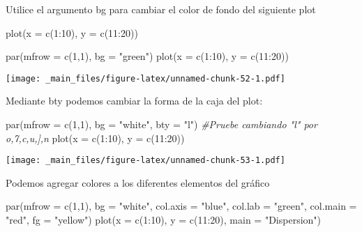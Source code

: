 \documentclass[
]{book}
\newenvironment{Shaded}{\begin{snugshade}}{\end{snugshade}}
\newcommand{\AttributeTok}[1]{\textcolor[rgb]{0.77,0.63,0.00}{#1}}
\newcommand{\CommentTok}[1]{\textcolor[rgb]{0.56,0.35,0.01}{\textit{#1}}}
\newcommand{\DecValTok}[1]{\textcolor[rgb]{0.00,0.00,0.81}{#1}}
\newcommand{\FunctionTok}[1]{\textcolor[rgb]{0.00,0.00,0.00}{#1}}
\newcommand{\NormalTok}[1]{#1}
\newcommand{\SpecialCharTok}[1]{\textcolor[rgb]{0.00,0.00,0.00}{#1}}
\newcommand{\StringTok}[1]{\textcolor[rgb]{0.31,0.60,0.02}{#1}}
\begin{document}
Utilice el argumento bg para cambiar el color de fondo del siguiente plot

\begin{Shaded}
\begin{Highlighting}[]
\FunctionTok{plot}\NormalTok{(}\AttributeTok{x =} \FunctionTok{c}\NormalTok{(}\DecValTok{1}\SpecialCharTok{:}\DecValTok{10}\NormalTok{), }\AttributeTok{y =} \FunctionTok{c}\NormalTok{(}\DecValTok{11}\SpecialCharTok{:}\DecValTok{20}\NormalTok{))}

\FunctionTok{par}\NormalTok{(}\AttributeTok{mfrow =} \FunctionTok{c}\NormalTok{(}\DecValTok{1}\NormalTok{,}\DecValTok{1}\NormalTok{), }\AttributeTok{bg =} \StringTok{"green"}\NormalTok{)}
\FunctionTok{plot}\NormalTok{(}\AttributeTok{x =} \FunctionTok{c}\NormalTok{(}\DecValTok{1}\SpecialCharTok{:}\DecValTok{10}\NormalTok{), }\AttributeTok{y =} \FunctionTok{c}\NormalTok{(}\DecValTok{11}\SpecialCharTok{:}\DecValTok{20}\NormalTok{))}
\end{Highlighting}
\end{Shaded}

\texttt{[image: \_main\_files/figure-latex/unnamed-chunk-52-1.pdf]}

Mediante bty podemos cambiar la forma de la caja del plot:

\begin{Shaded}
\begin{Highlighting}[]
\FunctionTok{par}\NormalTok{(}\AttributeTok{mfrow =} \FunctionTok{c}\NormalTok{(}\DecValTok{1}\NormalTok{,}\DecValTok{1}\NormalTok{), }\AttributeTok{bg =} \StringTok{"white"}\NormalTok{, }\AttributeTok{bty =} \StringTok{"l"}\NormalTok{) }\CommentTok{\#Pruebe cambiando "l" por o,7,c,u,],n}
\FunctionTok{plot}\NormalTok{(}\AttributeTok{x =} \FunctionTok{c}\NormalTok{(}\DecValTok{1}\SpecialCharTok{:}\DecValTok{10}\NormalTok{), }\AttributeTok{y =} \FunctionTok{c}\NormalTok{(}\DecValTok{11}\SpecialCharTok{:}\DecValTok{20}\NormalTok{))}
\end{Highlighting}
\end{Shaded}

\texttt{[image: \_main\_files/figure-latex/unnamed-chunk-53-1.pdf]}

Podemos agregar colores a los diferentes elementos del gráfico

\begin{Shaded}
\begin{Highlighting}[]
\FunctionTok{par}\NormalTok{(}\AttributeTok{mfrow =} \FunctionTok{c}\NormalTok{(}\DecValTok{1}\NormalTok{,}\DecValTok{1}\NormalTok{), }\AttributeTok{bg =} \StringTok{"white"}\NormalTok{, }\AttributeTok{col.axis =} \StringTok{"blue"}\NormalTok{, }\AttributeTok{col.lab =} \StringTok{"green"}\NormalTok{, }\AttributeTok{col.main =} \StringTok{"red"}\NormalTok{, }\AttributeTok{fg =} \StringTok{"yellow"}\NormalTok{) }
\FunctionTok{plot}\NormalTok{(}\AttributeTok{x =} \FunctionTok{c}\NormalTok{(}\DecValTok{1}\SpecialCharTok{:}\DecValTok{10}\NormalTok{), }\AttributeTok{y =} \FunctionTok{c}\NormalTok{(}\DecValTok{11}\SpecialCharTok{:}\DecValTok{20}\NormalTok{), }\AttributeTok{main =} \StringTok{"Dispersion"}\NormalTok{)}
\end{Highlighting}
\end{Shaded}
\end{document}
